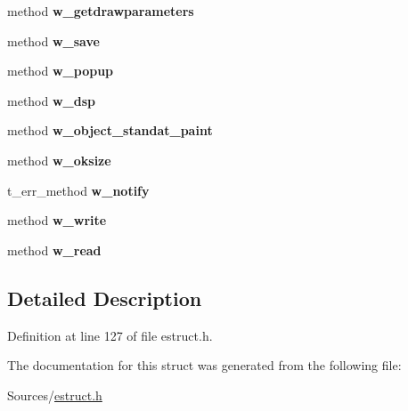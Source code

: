 \begin{DoxyCompactItemize}
\item 
\hypertarget{struct__ewidget_a5eb6013a425a581ee41c734f44eb5255}{method {\bfseries w\-\_\-getdrawparameters}}\label{struct__ewidget_a5eb6013a425a581ee41c734f44eb5255}

\item 
\hypertarget{struct__ewidget_a18f2be4123b21b24c9f2673d22eea9fb}{method {\bfseries w\-\_\-save}}\label{struct__ewidget_a18f2be4123b21b24c9f2673d22eea9fb}

\item 
\hypertarget{struct__ewidget_ad375827ec0dc5f2c712ba6f51608a44a}{method {\bfseries w\-\_\-popup}}\label{struct__ewidget_ad375827ec0dc5f2c712ba6f51608a44a}

\item 
\hypertarget{struct__ewidget_a6a3bf35bdca1508f50b885654b8fa8a1}{method {\bfseries w\-\_\-dsp}}\label{struct__ewidget_a6a3bf35bdca1508f50b885654b8fa8a1}

\item 
\hypertarget{struct__ewidget_a96ed05177c8899ca783c09f55229fc36}{method {\bfseries w\-\_\-object\-\_\-standat\-\_\-paint}}\label{struct__ewidget_a96ed05177c8899ca783c09f55229fc36}

\item 
\hypertarget{struct__ewidget_aef2440efc520270b766899eac0c50eaa}{method {\bfseries w\-\_\-oksize}}\label{struct__ewidget_aef2440efc520270b766899eac0c50eaa}

\item 
\hypertarget{struct__ewidget_ad60d080025f2fca515c7346761c0ded7}{t\-\_\-err\-\_\-method {\bfseries w\-\_\-notify}}\label{struct__ewidget_ad60d080025f2fca515c7346761c0ded7}

\item 
\hypertarget{struct__ewidget_a41f7c60b430e128c02fb13ffc5c9199d}{method {\bfseries w\-\_\-write}}\label{struct__ewidget_a41f7c60b430e128c02fb13ffc5c9199d}

\item 
\hypertarget{struct__ewidget_a08b27e9cb459b88a9418c61ac25e75df}{method {\bfseries w\-\_\-read}}\label{struct__ewidget_a08b27e9cb459b88a9418c61ac25e75df}

\end{DoxyCompactItemize}


\subsection{Detailed Description}


Definition at line 127 of file estruct.\-h.



The documentation for this struct was generated from the following file\-:\begin{DoxyCompactItemize}
\item 
Sources/\hyperlink{estruct_8h}{estruct.\-h}\end{DoxyCompactItemize}
